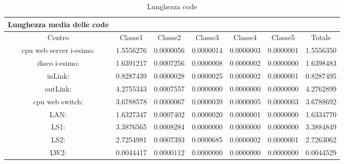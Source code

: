 \begin{table}[H]
\begin{center}
\begin{tabular}{||c|c|c|c|c|c|c||}
\hline
Lunghezza media delle code\\
\hline
Centro &Classe1 &Classe2 &Classe3 &Classe4 &Classe5 &Totale\\
\hline
\hline
 cpu web server i-esimo: 	&1.5556276	&0.0000056	&0.0000014	&0.0000003	&0.0000001	&1.5556350\\
\hline
 disco i-esimo: 	&1.6391217	&0.0007256	&0.0000008	&0.0000002	&0.0000000	&1.6398483\\
\hline
 inLink: 	&0.8287439	&0.0000028	&0.0000025	&0.0000002	&0.0000001	&0.8287495\\
\hline
 outLink: 	&4.2755343	&0.0007557	&0.0000000	&0.0000000	&0.0000000	&4.2762899\\
\hline
 cpu web switch: 	&3.6788578	&0.0000067	&0.0000039	&0.0000005	&0.0000003	&3.6788692\\
\hline
 LAN: 	&1.6327347	&0.0007402	&0.0000020	&0.0000001	&0.0000000	&1.6334770\\
\hline
 LS1: 	&3.3876565	&0.0008284	&0.0000000	&0.0000000	&0.0000000	&3.3884849\\
\hline
 LS2: 	&2.7254981	&0.0007393	&0.0000685	&0.0000002	&0.0000001	&2.7263062\\
\hline
 LW2: 	&0.0044417	&0.0000112	&0.0000000	&0.0000000	&0.0000000	&0.0044529\\
\hline
\end{tabular}
\end{center}
\caption{Lunghezza code}
\label{ris}
\end{table}

